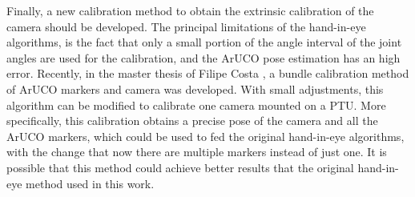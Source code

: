 Finally, a new calibration method to obtain the extrinsic calibration of the camera should be developed. The principal limitations of the hand-in-eye algorithms, is the fact that only a small portion of the angle interval of the joint angles are used for the calibration, and the ArUCO pose estimation has an high error. Recently, in the master thesis of Filipe Costa \cite{costa18}, a bundle calibration method of ArUCO markers and camera was developed. With small adjustments, this algorithm can be modified to calibrate one camera mounted on a PTU. More specifically, this calibration obtains a precise pose of the camera and all the ArUCO markers, which could be used to fed the original hand-in-eye algorithms, with the change that now there are multiple markers instead of just one. It is possible that this method could achieve better results that the original hand-in-eye method used in this work.
